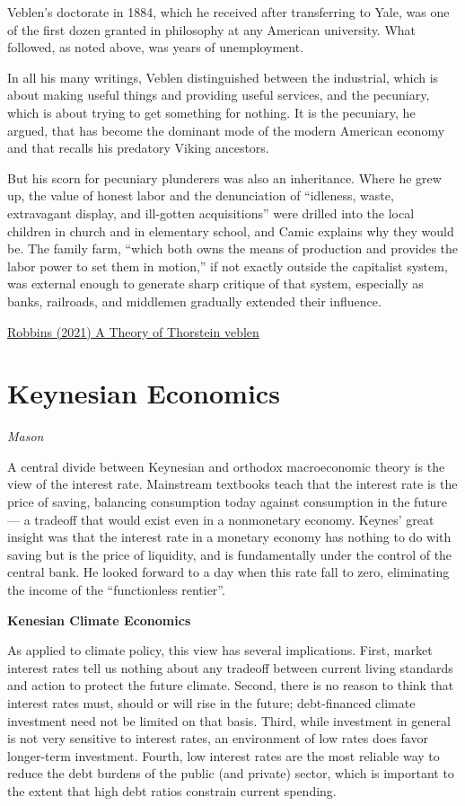 \documentclass[
]{book}
\begin{document}
Veblen's doctorate in 1884, which he received after transferring to Yale, was one of the first dozen granted in philosophy at any American university. What followed, as noted above, was years of unemployment.

In all his many writings, Veblen distinguished between the industrial, which is about making useful things and providing useful services, and the pecuniary, which is about trying to get something for nothing. It is the pecuniary, he argued, that has become the dominant mode of the modern American economy and that recalls his predatory Viking ancestors.

But his scorn for pecuniary plunderers was also an inheritance. Where he grew up, the value of honest labor and the denunciation of ``idleness, waste, extravagant display, and ill-gotten acquisitions'' were drilled into the local children in church and in elementary school, and Camic explains why they would be. The family farm, ``which both owns the means of production and provides the labor power to set them in motion,'' if not exactly outside the capitalist system, was external enough to generate sharp critique of that system, especially as banks, railroads, and middlemen gradually extended their influence.

\href{https://thebaffler.com/latest/a-theory-of-thorstein-veblen-robbins}{Robbins (2021) A Theory of Thorstein veblen}

\hypertarget{keynesian-economics}{%
\chapter{Keynesian Economics}\label{keynesian-economics}}

\emph{Mason}

A central divide between Keynesian and orthodox macroeconomic theory is the view of the interest rate. Mainstream textbooks teach that the interest rate is the price of saving, balancing consumption today against consumption in the future --- a tradeoff that would exist even in a nonmonetary economy. Keynes' great insight was that the interest rate in a monetary economy has nothing to do with saving but is the price of liquidity, and is fundamentally under the control of the central bank. He looked forward to a day when this rate fall to zero, eliminating the income of the ``functionless rentier''.

\textbf{Kenesian Climate Economics}

As applied to climate policy, this view has several implications. First, market interest rates tell us nothing about any tradeoff between current living standards and action to protect the future climate. Second, there is no reason to think that interest rates must, should or will rise in the future; debt-financed climate investment need not be limited on that basis. Third, while investment in general is not very sensitive to interest rates, an environment of low rates does favor longer-term investment. Fourth, low interest rates are the most reliable way to reduce the debt burdens of the public (and private) sector, which is important to the extent that high debt ratios constrain current spending.
\end{document}
